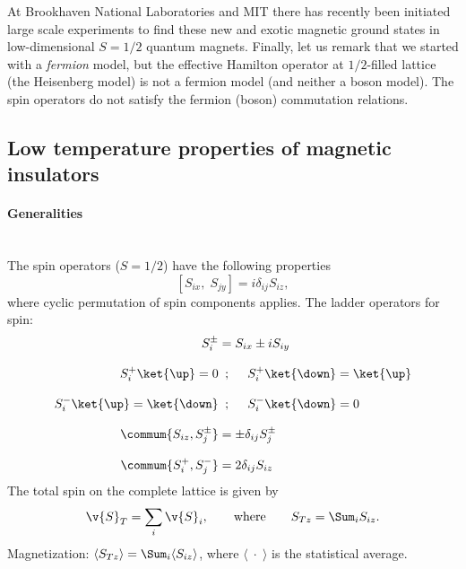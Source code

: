 At Brookhaven National Laboratories and MIT there has recently been initiated large scale experiments to find these new and exotic magnetic ground states
in low-dimensional $S=1/2$ quantum magnets. Finally, let us remark that we started with a \emph{fermion} model, but the effective Hamilton operator at $1/2$-filled lattice
(the Heisenberg model) is not a fermion model (and neither a boson model). The spin operators do not satisfy the fermion (boson) commutation relations.



\subsection{Low temperature properties of magnetic insulators}
\paragraph{Generalities}\hspace{0pt}\\
The spin operators ($S=1/2$) have the following properties
\[[S_{ix},\;S_{jy}] = i\delta_{ij}S_{iz},\]
where cyclic permutation of spin components applies. The ladder operators for spin:
\[\begin{array}{r@{\;}c@{\;}l}
	S_i^\pm 					& =	& S_{ix}\pm iS_{iy}\\\\
	S_i^+\ket{\up}=0			& ;	& \quad S_i^+\ket{\down} = \ket{\up}\\\\
	S_i^-\ket{\up}=\ket{\down}	& ;	& \quad S_i^-\ket{\down} = 0\\\\
	\commum{S_{iz},S_j^\pm}		& =	& \pm\delta_{ij}S_j^\pm\\\\
	\commum{S_i^+,S_j^-}		& =	& 2\delta_{ij}S_{iz}
\end{array}\]
The total spin on the complete lattice is given by
\[\v{S}_T=\sum_i\v{S}_i,\qquad\text{where}\qquad S_{Tz} = \Sum_iS_{iz}.\]
Magnetization: $\langle S_{Tz}\rangle = \Sum_i\langle S_{iz}\rangle$, where $\langle\;\cdot\;\rangle$ is the statistical average.

